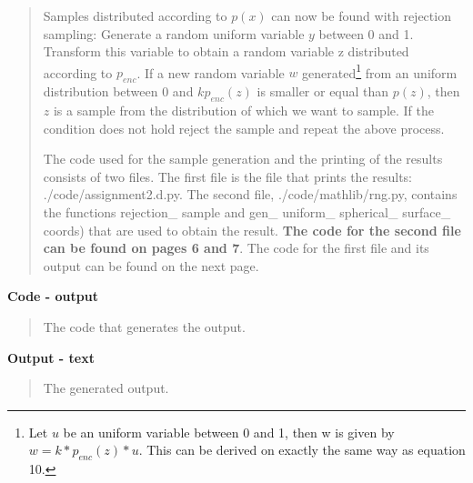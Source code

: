 \begin{quote}
Samples distributed according to $p(x)$ can now be found with rejection sampling:  Generate a random uniform variable $y$ between 0 and 1. Transform this variable to obtain a random variable z distributed according to $p_{enc}$. If a new random variable $w$ generated\footnote{Let $u$ be an uniform variable between 0 and 1, then w is given by $w = k*p_{enc}(z)*u$. This can be derived on exactly the same way as equation 10.} from an uniform distribution between 0 and $k p_{enc}(z)$  is smaller or equal than $ p(z)$, then $z$ is a sample from the distribution of which we want to sample. If the condition does not hold reject the sample and repeat the above process.    



The code used for the sample generation and the printing of the results consists of two files. The first file is the file that prints the results: \textsf{./code/assignment2.d.py}.  The second file, \textsf{./code/mathlib/rng.py}, contains the functions \textsf{rejection\_ sample} and \textsf{gen\_ uniform\_ spherical\_ surface\_ coords}) that are used to obtain the result. \textbf{The code for the second file can be found on pages 6 and 7}. The code for the first file and its output can be found on the next page.


\end{quote}

\textbf{Code - output}
\begin{quote}

The code that generates the output. 

\end{quote}

\textbf{Output - text}
\begin{quote}
The generated output.

\end{quote}











